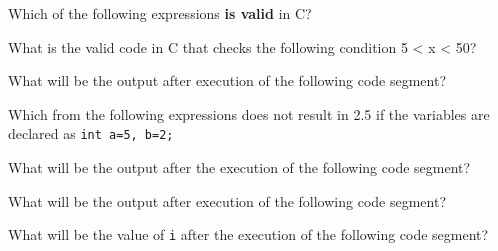 \documentclass[11pt]{examdesign}
\begin{document}

\begin{multiplechoice}[title={},suppressprefix=yes,rearrange=no]

\begin{question}
Which of the following expressions \textbf{is valid} in C?
\end{question}

\begin{question}
What is the valid code in C that checks the following condition 5 < x <
50?
\end{question}

\begin{question}
What will be the output after execution of the following code segment?
\end{question}

\begin{question}
Which from the following expressions does not result in 2.5 if the variables are declared as \texttt{int a=5, b=2;}
\end{question}

\begin{question}
What will be the output after the execution of the following code segment?
\end{question}
  
\begin{question}
What will be the output after execution of the following code segment?
\end{question}

\begin{question}
What will be the value of \texttt{i} after the execution of the following code segment?
\end{question}
  

\end{multiplechoice}
\end{document}
